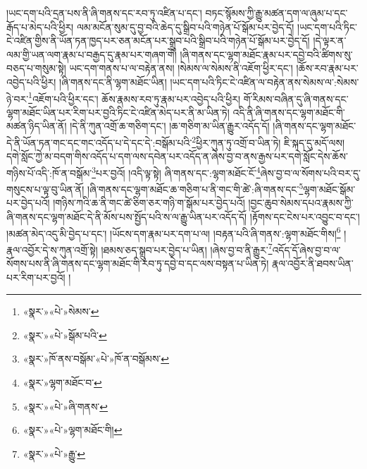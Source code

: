 །ཡང་དག་པའི་དྲན་པས་ནི་ཞི་གནས་དང་རབ་ཏུ་འཛིན་པ་དང་། བཏང་སྙོམས་ཀྱི་རྒྱུ་མཚན་དག་ལ་ཞུམ་པ་དང་རྒོད་པ་མེད་པའི་ཕྱིར། ལམ་མངོན་སུམ་དུ་བྱ་བའི་ཆེད་དུ་སྒྲིབ་པའི་གཉེན་པོ་སྒོམ་པར་བྱེད་དོ། །ཡང་དག་པའི་ཏིང་ངེ་འཛིན་གྱིས་ནི་ཡོན་ཏན་ཁྱད་པར་ཅན་མངོན་པར་སྒྲུབ་པའི་སྒྲིབ་པའི་གཉེན་པོ་སྒོམ་པར་བྱེད་དོ། །དེ་ལྟར་ན་ལམ་གྱི་ཡན་ལག་རྣམ་པ་བརྒྱད་དུ་རྣམ་པར་གཞག་གོ། །ཞི་གནས་དང་ལྷག་མཐོང་རྣམ་པར་དབྱེ་བའི་ཚིགས་སུ་བཅད་པ་གསུམ་སྟེ། ཡང་དག་གནས་པ་ལ་བརྟེན་ནས། །སེམས་ལ་སེམས་ནི་འཇོག་ཕྱིར་དང་། །ཆོས་རབ་རྣམ་པར་འབྱེད་པའི་ཕྱིར། །ཞི་གནས་དང་ནི་ལྷག་མཐོང་ཡིན། །ཡང་དག་པའི་ཏིང་ངེ་འཛིན་ལ་བརྟེན་ནས་སེམས་ལ་:སེམས་ཉེ་བར་\footnote{«སྣར་»«པེ་»སེམས་}འཇོག་པའི་ཕྱིར་དང་། ཆོས་རྣམས་རབ་ཏུ་རྣམ་པར་འབྱེད་པའི་ཕྱིར། གོ་རིམས་བཞིན་དུ་ཞི་གནས་དང་ལྷག་མཐོང་ཡིན་པར་རིག་པར་བྱའི་ཏིང་ངེ་འཛིན་མེད་པར་ནི་མ་ཡིན་ཏེ། འདི་ནི་ཞི་གནས་དང་ལྷག་མཐོང་གི་མཚན་ཉིད་ཡིན་ནོ། །དེ་ནི་ཀུན་འགྲོ་ཆ་གཅིག་དང་། །ཆ་གཅིག་མ་ཡིན་རྒྱུར་འདོད་དོ། །ཞི་གནས་དང་ལྷག་མཐོང་དེ་ནི་ཡོན་ཏན་གང་དང་གང་འདོད་པ་དེ་དང་དེ་:བསྒོམ་པའི་\footnote{«སྣར་»«པེ་»སྒོམ་པའི་}ཕྱིར་ཀུན་ཏུ་འགྲོ་བ་ཡིན་ཏེ། ཇི་སྐད་དུ་མདོ་ལས། དགེ་སློང་ཀྱེ་མ་བདག་གིས་འདོད་པ་དག་ལས་དབེན་པར་འདོད་ན་ཞེས་བྱ་བ་ནས་རྒྱས་པར་དགེ་སློང་དེས་ཆོས་གཉིས་པོ་འདི་:ཁོ་ན་བསྒོམ་\footnote{«སྣར་»ཁོ་ནས་བསྒོམ་«པེ་»ཁོ་ན་བསྒོམས་}པར་བྱའོ། །འདི་ལྟ་སྟེ། ཞི་གནས་དང་:ལྷག་མཐོང་ངོ་\footnote{«སྣར་»ལྷག་མཐོང་བ་}ཞེས་བྱ་བ་ལ་སོགས་པའི་བར་དུ་གསུངས་པ་ལྟ་བུ་ཡིན་ནོ། །ཞི་གནས་དང་ལྷག་མཐོང་ཆ་གཅིག་པ་ནི་གང་གི་ཚེ་:ཞི་གནས་དང་\footnote{«སྣར་»«པེ་»ཞི་གནས་}ལྷག་མཐོང་སྒོམ་པར་བྱེད་པའོ། །གཉིས་ཀའི་ཆ་ནི་གང་ཚེ་ཅིག་ཅར་གཉི་ག་སྒོམ་པར་བྱེད་པའོ། །བྱང་ཆུབ་སེམས་དཔའ་རྣམས་ཀྱི་ཞི་གནས་དང་ལྷག་མཐོང་དེ་ནི་མོས་པས་སྤྱོད་པའི་ས་ལ་རྒྱུ་ཡིན་པར་འདོད་དོ། །རྟོགས་དང་ངེས་པར་འབྱུང་བ་དང་། །མཚན་མེད་འདུ་མི་བྱེད་པ་དང་། །ཡོངས་དག་རྣམ་པར་དག་པ་ལ། །བརྟན་པའི་ཞི་གནས་:ལྷག་མཐོང་གིས།\footnote{«སྣར་»«པེ་»ལྷག་མཐོང་གི།} །རྣལ་འབྱོར་དེ་ས་ཀུན་འགྲོ་སྟེ། །ཐམས་ཅད་སྒྲུབ་པར་བྱེད་པ་ཡིན། །ཞེས་བྱ་བ་ནི་རྒྱུར་\footnote{«སྣར་»«པེ་»རྒྱུ་}འདོད་དོ་ཞེས་བྱ་བ་ལ་སོགས་པས་ནི་ཞི་གནས་དང་ལྷག་མཐོང་གི་རབ་ཏུ་དབྱེ་བ་དང་ལས་བསྟན་པ་ཡིན་ཏེ། རྣལ་འབྱོར་ནི་ཐབས་ཡིན་པར་རིག་པར་བྱའོ། །
